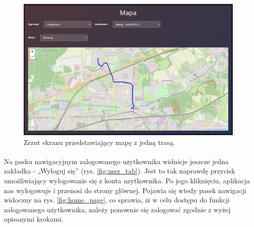 \begin{figure}
	\centering
	\includegraphics[width=1\textwidth]{./graf/map_route.png}
	\caption{Zrzut ekranu przedstawiający mapę z jedną trasą.}
	\label{fig:map_route}
\end{figure}


\paragraph{}
Na pasku nawigacyjnym zalogowanego użytkownika widnieje jeszcze jedna zakładka - „Wyloguj się” (rys. \ref{fig:user_tab}). Jest to tak naprawdę przycisk umożliwiający wylogowanie się z konta uzytkownika. Po jego kliknięciu, aplikacja nas wylogowuje i przenosi do strony głównej. Pojawia się wtedy pasek nawigacji widoczny na rys. \ref{fig:home_page}, co sprawia, iż w celu dostępu do funkcji zalogowanego użytkownika, należy ponownie się zalogować zgodnie z wyżej opisanymi krokami.

